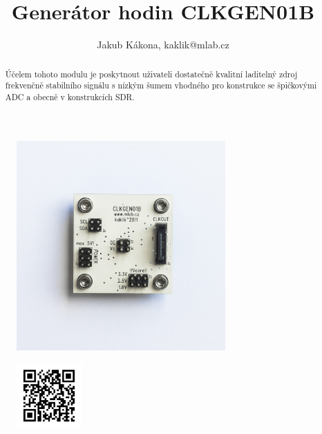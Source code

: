 \documentclass[12pt,a4paper,oneside]{article}
\begin{document}
\title{Generátor hodin CLKGEN01B}
\author{Jakub Kákona, kaklik@mlab.cz}
\maketitle

\thispagestyle{empty}
\begin{abstract}
Účelem tohoto modulu je poskytnout uživateli dostatečně kvalitní laditelný zdroj frekvenčně stabilního signálu s nízkým šumem vhodného pro konstrukce se špičkovými ADC a obecně v konstrukcích SDR.
\end{abstract}

\begin{figure} [htbp]
\begin{center}
\includegraphics [width=80mm] {./img/CLKGEN01B_Top_Big.jpg} 
\end{center}
\end{figure}

\begin{figure} [b]
\includegraphics [width=25mm] {./img/CLKGEN01B_QRcode.png} 
\end{figure}

\newpage
\tableofcontents
\end{document}
